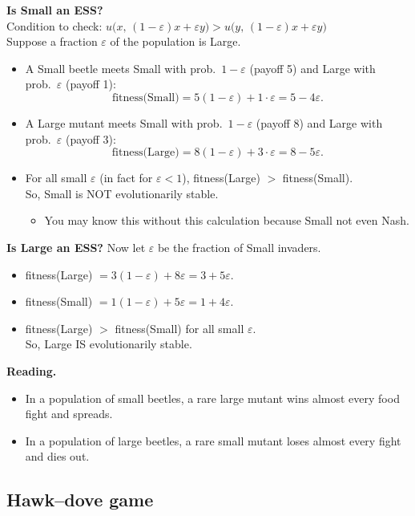 \documentclass[20pt]{extarticle}
\begin{document}
\noindent\textbf{Is Small an ESS?} \\
Condition to check: $u\bigl(x,\, (1-\varepsilon)x + \varepsilon y\bigr) > u\bigl(y,\, (1-\varepsilon)x + \varepsilon y\bigr)$\\
Suppose a fraction $\varepsilon$ of the population is Large.
\begin{itemize}
\item A Small beetle meets Small with prob.\ $1-\varepsilon$ (payoff 5) and Large with prob.\ $\varepsilon$ (payoff 1):
\[ \text{fitness(Small)} = 5(1-\varepsilon) + 1\cdot\varepsilon = 5 - 4\varepsilon. \]
\item A Large mutant meets Small with prob.\ $1-\varepsilon$ (payoff 8) and Large with prob.\ $\varepsilon$ (payoff 3):
\[ \text{fitness(Large)} = 8(1-\varepsilon) + 3\cdot\varepsilon = 8 - 5\varepsilon. \]
\item For all small $\varepsilon$ (in fact for $\varepsilon < 1$), fitness(Large) $>$ fitness(Small). \\
So, Small is NOT evolutionarily stable.
	\begin{itemize}
	\item You may know this without this calculation because Small not even Nash.
	\end{itemize}
\end{itemize}

\noindent\textbf{Is Large an ESS?} Now let $\varepsilon$ be the fraction of Small invaders.
\begin{itemize}
\item fitness(Large) $= 3(1-\varepsilon) + 8\varepsilon = 3 + 5\varepsilon$.
\item fitness(Small) $= 1(1-\varepsilon) + 5\varepsilon = 1 + 4\varepsilon$.
\item fitness(Large) $>$ fitness(Small) for all small $\varepsilon$. \\
So, Large IS evolutionarily stable.
\end{itemize}

\noindent\textbf{Reading.}
\begin{itemize}
\item In a population of small beetles, a rare large mutant wins almost every food fight and spreads.
\item In a population of large beetles, a rare small mutant loses almost every fight and dies out.
\end{itemize}

\subsection*{Hawk--dove game}
\end{document}
